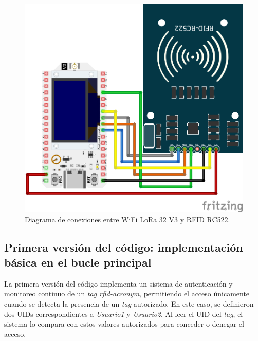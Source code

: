 \begin{figure}[H]
\leavevmode
\begin{minipage}{\textwidth}
\begin{center}
\includegraphics[scale=0.8]{./capitulo_04/imagen/diagramaRFID.png}
\caption{Diagrama de conexiones entre WiFi LoRa 32 V3 y RFID RC522. \label{fig:conexionrfid}}
\end{center}
\end{minipage}
\end{figure}

\subsection{Primera versión del código: implementación básica en el bucle principal}

La primera versión del código implementa un sistema de autenticación y monitoreo continuo de un \textit{tag \acrshort{rfid-acronym}}, permitiendo el acceso únicamente cuando se detecta la presencia de un \textit{tag} autorizado. En este caso, se definieron dos UIDs correspondientes a \textit{Usuario1} y \textit{Usuario2}. Al leer el UID del \textit{tag}, el sistema lo compara con estos valores autorizados para conceder o denegar el acceso.

